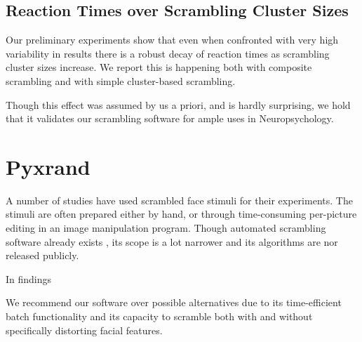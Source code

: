 	\subsection{Reaction Times over Scrambling Cluster Sizes}
	    Our preliminary experiments show that even when confronted with very high variability in results there is a robust decay of reaction times as scrambling cluster sizes increase.
	    We report this is happening both with composite scrambling and with simple cluster-based scrambling.
	    
	    Though this effect was assumed by us a priori, and is hardly surprising, we hold that it validates our scrambling software for ample uses in Neuropsychology.
    \section{Pyxrand}
    A number of studies\cite{Rakover2013} have used scrambled face stimuli for their experiments.
    The stimuli are often prepared either by hand, or through time-consuming per-picture editing in an image manipulation program.
    Though automated scrambling software already exists \cite{Conway2008}, its scope is a lot narrower and its algorithms are nor released publicly.
    
    In findings 
    
    We recommend our software over possible alternatives due to its time-efficient batch functionality and its capacity to scramble both with and without specifically distorting facial features.



